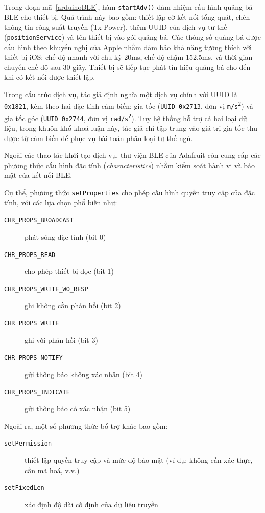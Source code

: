 Trong đoạn mã~\ref{arduinoBLE}, hàm \texttt{startAdv()} đảm nhiệm cấu 
hình quảng bá BLE cho thiết bị. Quá trình này bao gồm: thiết lập cờ 
kết nối tổng quát, chèn thông tin công suất truyền (Tx Power), 
thêm UUID của dịch vụ tư thế (\texttt{positionService}) và tên thiết 
bị vào gói quảng bá. Các thông số quảng bá được cấu hình theo khuyến 
nghị của Apple nhằm đảm bảo khả năng tương thích với thiết bị iOS: 
chế độ nhanh với chu kỳ 20ms, chế độ chậm 152.5ms, và thời gian chuyển 
chế độ sau 30 giây. Thiết bị sẽ tiếp tục phát tín hiệu quảng bá cho 
đến khi có kết nối được thiết lập.

Trong cấu trúc dịch vụ, tác giả định nghĩa một dịch vụ chính với UUID 
là \texttt{0x1821}, kèm theo hai đặc tính cảm biến: gia tốc 
(\texttt{UUID 0x2713}, đơn vị \texttt{m/s\textsuperscript{2}}) và 
gia tốc góc (\texttt{UUID 0x2744}, 
đơn vị \texttt{rad/s\textsuperscript{2}}). 
Tuy hệ thống hỗ trợ cả hai loại dữ liệu, trong khuôn khổ khoá luận này, 
tác giả chỉ tập trung vào giá trị gia tốc thu được từ cảm biến để phục 
vụ bài toán phân loại tư thế ngủ.



Ngoài các thao tác khởi tạo dịch vụ, thư viện BLE của Adafruit còn cung cấp các phương thức cấu hình đặc tính (\textit{characteristics}) nhằm kiểm soát hành vi và bảo mật của kết nối BLE.

Cụ thể, phương thức \texttt{setProperties} cho phép cấu hình quyền truy cập của đặc tính, với các lựa chọn phổ biến như:

\begin{description}
    \item[\texttt{CHR\_PROPS\_BROADCAST}] phát sóng đặc tính (bit 0)
    \item[\texttt{CHR\_PROPS\_READ}] cho phép thiết bị đọc (bit 1)
    \item[\texttt{CHR\_PROPS\_WRITE\_WO\_RESP}] ghi không cần phản hồi (bit 2)
    \item[\texttt{CHR\_PROPS\_WRITE}] ghi với phản hồi (bit 3)
    \item[\texttt{CHR\_PROPS\_NOTIFY}] gửi thông báo không xác nhận (bit 4)
    \item[\texttt{CHR\_PROPS\_INDICATE}] gửi thông báo có xác nhận (bit 5)
\end{description}

Ngoài ra, một số phương thức bổ trợ khác bao gồm:

\begin{description}
    \item[\texttt{setPermission}] thiết lập quyền truy cập và mức độ bảo mật (ví dụ: không cần xác thực, cần mã hoá, v.v.)
    \item[\texttt{setFixedLen}] xác định độ dài cố định của dữ liệu truyền
\end{description}

